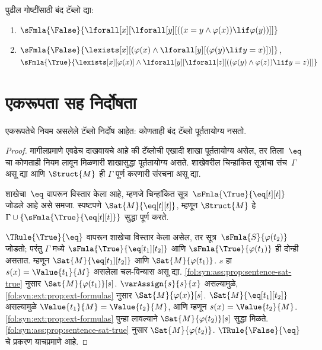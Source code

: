 \begin{prob}
पुढील गोष्टींसाठी बंद टॅब्लो द्या:
\begin{enumerate}
\item $\sFmla{\False}{\lforall[x][\lforall[y][((x = y \land \varphi(x))
      \lif \varphi(y))]]}$
\item $\sFmla{\False}{\lexists[x][(\varphi(x) \land
    \lforall[y][(\varphi(y) \lif y = x)])]}$,\\
  $\sFmla{\True}{\lexists[x][\varphi(x)] \land
    \lforall[y][\lforall[z][((\varphi(y) \land \varphi(z)) \lif y = z)]]}$
\end{enumerate}
\end{prob}












\section{एकरूपता सह निर्दोषता}\label{fol:tab:sid:sec}

\begin{prop}
एकरूपतेचे नियम असलेले टॅब्लो निर्दोष आहेत: कोणताही बंद टॅब्लो
  पूर्ततायोग्य नसतो.
\end{prop}

\begin{proof}
मागीलप्रमाणे एवढेच दाखवायचे आहे की टॅब्लोची एखादी शाखा पूर्ततायोग्य
असेल, तर तिला~$\eq$ चा कोणताही नियम लावून मिळणारी शाखासुद्धा पूर्ततायोग्य
असते. शाखेवरील चिन्हांकित सूत्रांचा संच~$\Gamma$ असू द्या आणि
$\Struct{M}$ ही $\Gamma$ पूर्ण करणारी संरचना असू द्या.

शाखेचा~$\eq$ वापरून विस्तार केला आहे, म्हणजे चिन्हांकित
सूत्र~$\sFmla{\True}{\eq[t][t]}$ जोडले आहे असे समजा. स्पष्टपणे
$\Sat{M}{\eq[t][t]}$, म्हणून $\Struct{M}$ हे
$\Gamma \cup \{\sFmla{\True}{\eq[t][t]}\}$ सुद्धा पूर्ण करते.

$\TRule{\True}{\eq}$ वापरून शाखेचा विस्तार केला असेल, तर
सूत्र~$\sFmla{S}{\varphi(t_2)}$ जोडतो; परंतु $\Gamma$ मध्ये
$\sFmla{\True}{\eq[t_1][t_2]}$ आणि $\sFmla{\True}{\varphi(t_1)}$ ही दोन्ही
असतात. म्हणून $\Sat{M}{\eq[t_1][t_2]}$ आणि $\Sat{M}{\varphi(t_1)}$.
$s$ हा $s(x) = \Value{t_1}{M}$ असलेला चल-विन्यास असू द्या.
\ref{fol:syn:ass:prop:sentence-sat-true} नुसार
$\Sat{M}{\varphi(t_1)}[s]$. $\varAssign{s}{s}{x}$ असल्यामुळे,
\ref{fol:syn:ext:prop:ext-formulas} नुसार $\Sat{M}{\varphi(x)}[s]$.
$\Sat{M}{\eq[t_1][t_2]}$ असल्यामुळे
$\Value{t_1}{M} = \Value{t_2}{M}$, आणि म्हणून
$s(x) = \Value{t_2}{M}$. \ref{fol:syn:ext:prop:ext-formulas} पुन्हा
लावल्याने $\Sat{M}{\varphi(t_2)}[s]$ सुद्धा मिळते.
\ref{fol:syn:ass:prop:sentence-sat-true} नुसार
$\Sat{M}{\varphi(t_2)}$. $\TRule{\False}{\eq}$ चे प्रकरण याचप्रमाणे आहे.
\end{proof}



\endgroup
